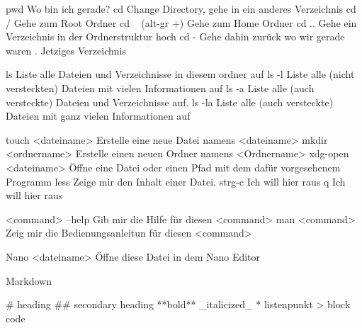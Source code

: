 pwd Wo bin ich gerade?
cd Change Directory, gehe in ein anderes Verzeichnis
cd / Gehe zum Root Ordner
cd ~ (alt-gr +) Gehe zum Home Ordner
cd .. Gehe ein Verzeichnis in der Ordnerstruktur hoch
cd - Gehe dahin zurück wo wir gerade waren
. Jetziges Verzeichnis

ls Liste alle Dateien und Verzeichnisse in diesem ordner auf
ls -l Liste alle (nicht versteckten) Dateien mit vielen Informationen auf
ls -a Liste alle (auch versteckte) Dateien und Verzeichnisse auf.
ls -la Liste alle (auch versteckte) Dateien mit ganz vielen Informationen auf

touch <dateiname> Erstelle eine neue Datei namens <dateiname>
mkdir <ordnername> Erstelle einen neuen Ordner namens <Ordnername>
xdg-open <dateiname> Öffne eine Datei oder einen Pfad mit dem dafür vorgesehenem Programm
less Zeige mir den Inhalt einer Datei.
strg-c Ich will hier raus
q Ich will hier raus

<command> --help Gib mir die Hilfe für diesen <command>
man <command> Zeig mir die Bedienungsanleitun für diesen <command>

Nano <dateiname> Öffne diese Datei in dem Nano Editor



Markdown

# heading
## secondary heading
**bold**
_italicized_
* listenpunkt
> block code

